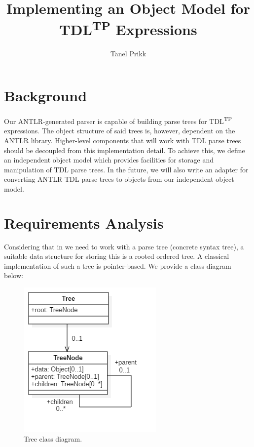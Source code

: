 \documentclass[12pt,oneside,a4paper,notitlepage]{report}
\title{
	Implementing an Object Model for TDL\textsuperscript{TP} Expressions
}
\author{Tanel Prikk}
\begin{document}
	\maketitle

	\section*{Background}
	\par Our ANTLR-generated parser is capable of building parse trees for TDL\textsuperscript{TP} expressions. The object structure of said trees is, however, dependent on the ANTLR library. Higher-level components that will work with TDL parse trees should be decoupled from this implementation detail. To achieve this, we define an independent object model which provides facilities for storage and manipulation of TDL parse trees. In the future, we will also write an adapter for converting ANTLR TDL parse trees to objects from our independent object model.

	\newpage

	\section*{Requirements Analysis}
	\par Considering that in we need to work with a parse tree (concrete syntax tree), a suitable data structure for storing this is a rooted ordered tree. A classical implementation of such a tree is pointer-based. We provide a class diagram below:

	\begin{figure}[h]
		\begin{center}
		\includegraphics{Models/BasicTree}
		\end{center}
		\caption{Tree class diagram.}
		\label{fig:basic-tree}
	\end{figure}
\end{document}
